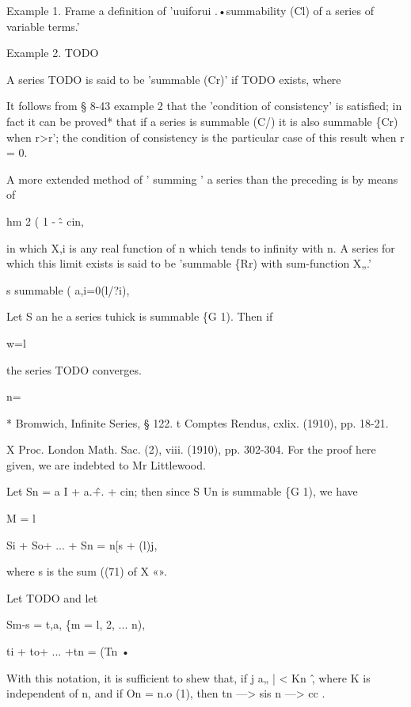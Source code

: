 Example 1. Frame a definition of 'uuiforui .•summability (Cl) of a
series of variable terms.'

Example 2. TODO


A series TODO is said to be 'summable (Cr)' if TODO exists, where

It follows from § 8-43 example 2 that the 'condition of consistency'
is satisfied; in fact it can be proved* that if a series is summable
(C/) it is also summable \{Cr) when r>r'; the condition of consistency
is the particular case of this result when r = 0.


A more extended method of ' summing ' a series than the preceding is
by means of

hm 2 ( 1 - \^- cin,

in which X,i is any real function of n which tends to infinity with n.
A series for which this limit exists is said to be 'summable \{Rr)
with sum-function X„.'


s summable ( a,i=0(l/?i),

Let S an he a series tuhick is summable \{G 1). Then if

w=l

the series TODO converges.

n=\

* Bromwich, Infinite Series, § 122. t Comptes Rendus, cxlix. (1910),
pp. 18-21.

X Proc. London Math. Sac. (2), viii. (1910), pp. 302-304. For the
proof here given, we are indebted to Mr Littlewood.

Let Sn = a I + a.\^ +. + cin; then since S Un is summable \{G 1), we
have

% 
% 

M = l

Si + So+ ... + Sn = n[s + (l)j,

where s is the sum ((71) of X «».

Let TODO and let

Sm-s = t,a, \{m = l, 2, ... n),

ti + to+ ... +tn = (Tn •

With this notation, it is sufficient to shew that, if j a„ | < Kn~\^,
where K is independent of n, and if On = n.o (1), then tn —> sis n —>
cc .

